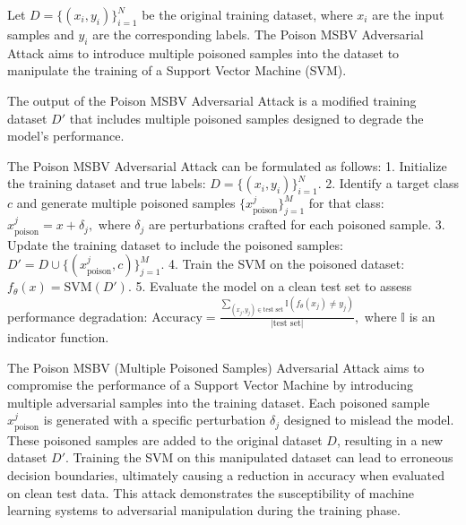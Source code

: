 Let \( D = \{(x_i, y_i)\}_{i=1}^N \) be the original training dataset, where \( x_i \) are the input samples and \( y_i \) are the corresponding labels. The Poison MSBV Adversarial Attack aims to introduce multiple poisoned samples into the dataset to manipulate the training of a Support Vector Machine (SVM).

The output of the Poison MSBV Adversarial Attack is a modified training dataset \( D' \) that includes multiple poisoned samples designed to degrade the model's performance.

The Poison MSBV Adversarial Attack can be formulated as follows:
1. Initialize the training dataset and true labels:
   $
   D = \{(x_i, y_i)\}_{i=1}^N.
   $
2. Identify a target class \( c \) and generate multiple poisoned samples \( \{x_{\text{poison}}^j\}_{j=1}^M \) for that class:
   $
   x_{\text{poison}}^j = x + \delta_j,
   $
   where \( \delta_j \) are perturbations crafted for each poisoned sample.
3. Update the training dataset to include the poisoned samples:
   $
   D' = D \cup \{(x_{\text{poison}}^j, c)\}_{j=1}^M.
   $
4. Train the SVM on the poisoned dataset:
   $
   f_{\theta}(x) = \text{SVM}(D').
   $
5. Evaluate the model on a clean test set to assess performance degradation:
   $
   \text{Accuracy} = \frac{\sum_{(x_j, y_j) \in \text{test set}} \mathbb{I}(f_{\theta}(x_j) \neq y_j)}{|\text{test set}|},
   $
   where \( \mathbb{I} \) is an indicator function.

The Poison MSBV (Multiple Poisoned Samples) Adversarial Attack aims to compromise the performance of a Support Vector Machine by introducing multiple adversarial samples into the training dataset. Each poisoned sample \( x_{\text{poison}}^j \) is generated with a specific perturbation \( \delta_j \) designed to mislead the model. These poisoned samples are added to the original dataset \( D \), resulting in a new dataset \( D' \). Training the SVM on this manipulated dataset can lead to erroneous decision boundaries, ultimately causing a reduction in accuracy when evaluated on clean test data. This attack demonstrates the susceptibility of machine learning systems to adversarial manipulation during the training phase.
